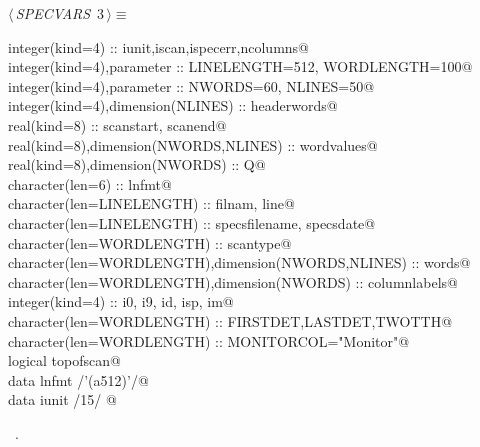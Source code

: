\documentclass[10pt,a4paper,notitlepage]{article}
\begin{document}
\begin{flushleft} \small
\begin{minipage}{\linewidth}\label{scrap1}\raggedright\small
{} $\langle\,${\it SPECVARS}\nobreak\ {\footnotesize {3}}$\,\rangle\equiv$
\vspace{-1ex}
\begin{list}{}{} \item
\mbox{}\verb@      integer(kind=4) :: iunit,iscan,ispecerr,ncolumns@\\
\mbox{}\verb@      integer(kind=4),parameter :: LINELENGTH=512, WORDLENGTH=100@\\
\mbox{}\verb@      integer(kind=4),parameter :: NWORDS=60, NLINES=50@\\
\mbox{}\verb@      integer(kind=4),dimension(NLINES) :: headerwords@\\
\mbox{}\verb@      real(kind=8) :: scanstart, scanend@\\
\mbox{}\verb@      real(kind=8),dimension(NWORDS,NLINES) :: wordvalues@\\
\mbox{}\verb@      real(kind=8),dimension(NWORDS) :: Q@\\
\mbox{}\verb@      character(len=6) :: lnfmt@\\
\mbox{}\verb@      character(len=LINELENGTH) :: filnam, line@\\
\mbox{}\verb@      character(len=LINELENGTH) :: specsfilename, specsdate@\\
\mbox{}\verb@      character(len=WORDLENGTH) :: scantype@\\
\mbox{}\verb@      character(len=WORDLENGTH),dimension(NWORDS,NLINES) :: words@\\
\mbox{}\verb@      character(len=WORDLENGTH),dimension(NWORDS) :: columnlabels@\\
\mbox{}\verb@      integer(kind=4) :: i0, i9, id, isp, im@\\
\mbox{}\verb@      character(len=WORDLENGTH) :: FIRSTDET,LASTDET,TWOTTH@\\
\mbox{}\verb@      character(len=WORDLENGTH) :: MONITORCOL="Monitor"@\\
\mbox{}\verb@      logical topofscan@\\
\mbox{}\verb@      data lnfmt /'(a512)'/@\\
\mbox{}\verb@      data iunit /15/                                                        @{\NWsep}
\end{list}
\vspace{-1.5ex}
\footnotesize
\begin{list}{}{\setlength{\itemsep}{-\parsep}\setlength{\itemindent}{-\leftmargin}}
\item \NWtxtMacroRefIn\ .

\item{}
\end{list}
\end{minipage}\vspace{4ex}
\end{flushleft}
\end{document}
